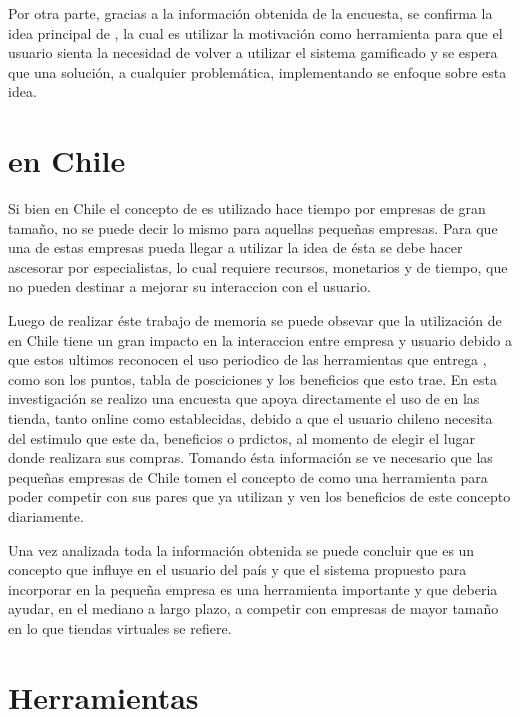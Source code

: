 Por otra parte, gracias a la información obtenida de la encuesta, se confirma la
idea principal de {\gam}, la cual es utilizar la motivación como herramienta para
que el usuario sienta la necesidad de volver a utilizar el sistema gamificado y
se espera que una solución, a cualquier problemática, implementando {\gam} se
enfoque sobre esta idea.

\section{{\GAM} en Chile}

Si bien en Chile el concepto de {\gam} es utilizado hace tiempo por empresas de gran tamaño, no se
puede decir lo mismo para aquellas pequeñas empresas. Para que una de estas empresas pueda
llegar a utilizar la idea de {\gam} ésta se debe hacer ascesorar por especialistas, lo cual 
requiere recursos, monetarios y de tiempo, que no pueden destinar a mejorar su interaccion con el usuario. 

Luego de realizar éste trabajo de memoria se puede obsevar que la utilización de {\gam} en Chile tiene 
un gran impacto en la interaccion entre empresa y usuario debido a que estos ultimos reconocen el uso
periodico de las herramientas que entrega {\gam}, como son los puntos, tabla de posciciones y los 
beneficios que esto trae. 
En esta investigación se realizo una encuesta que apoya directamente el uso de {\gam} en las tienda, tanto
online como establecidas, debido a que el usuario chileno necesita del estimulo que este da, beneficios o prdictos, 
al momento de elegir el lugar donde realizara sus compras. Tomando ésta información se ve necesario que las
pequeñas empresas de Chile tomen el concepto de {\gam} como una herramienta para poder competir con sus 
pares que ya utilizan {\gam} y ven los beneficios de este concepto diariamente.

Una vez analizada toda la información obtenida se puede concluir que {\gam} es un concepto que influye 
en el usuario del país y que el sistema propuesto para incorporar {\gam} en la pequeña empresa
es una herramienta importante y que deberia ayudar, en el mediano a largo plazo, a competir con empresas
de mayor tamaño en lo que tiendas virtuales se refiere. 

\section{Herramientas}

